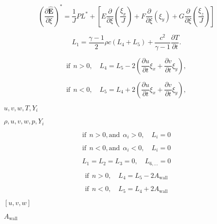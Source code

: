 \documentclass{article}
\begin{document}
\[ \begin{equation*} \left(\frac{\partial \hat{\mathbf{E}}}{\partial \xi} \right)^*=\frac{1}{J}P L^*+\left[E\frac{\partial}{\partial \xi}\left(\frac{\xi_x}{J}\right)+F \frac{\partial}{\partial \xi}\left( \xi_y\right)+G \frac{\partial}{\partial \xi}\left(\frac{\xi_z}{J}\right) \right] \end{equation*} \]
\pagebreak

\[ \begin{equation*} L_1=\frac{\gamma -1}{2}{\rho}{c}(L_4+L_5)+\frac{c^2}{\gamma-1}\frac{\partial T}{\partial t}. \end{equation*} \]
\pagebreak

\[ \begin{equation*} \text{if}\ \ n>0, \quad L_4=L_5-2\left(\frac{\partial u}{\partial t}\xi_x+\frac{\partial v}{\partial t}\xi_y\right), \end{equation*} \]
\pagebreak

\[ \begin{equation*} \text{if}\ \ n<0, \quad L_5=L_4+2\left(\frac{\partial u}{\partial t}\xi_x+\frac{\partial v}{\partial t}\xi_y\right), \end{equation} \]
\pagebreak

$u,v,w, T,Y_i$
\pagebreak

$\rho,u,v,w,p,Y_i$
\pagebreak

\[ \begin{equation*} \text{if}\ \ n>0, \text{and} \ \ \alpha_i>0, \quad L_i=0 \end{equation*} \]
\pagebreak

\[ \begin{equation*} \text{if}\ \ n<0, \text{and} \ \ \alpha_i<0, \quad L_i=0 \end{equation*} \]
\pagebreak

\[ \begin{equation*} L_1=L_2=L_3=0, \quad L_{6,...}=0 \end{equation*} \]
\pagebreak

\[ \begin{equation*} \text{if}\ \ n>0, \quad L_4=L_5-2A_{\text{wall}} \end{equation*} \]
\pagebreak

\[ \begin{equation*} \text{if}\ \ n<0, \quad L_5=L_4 +2 A_{\text{wall}} \end{equation*} \]
\pagebreak

$[u,v,w]$
\pagebreak

$A_{\text{wall}}$
\pagebreak
\end{document}

